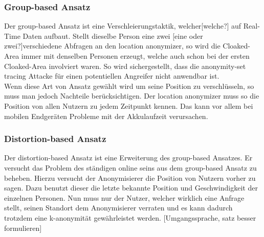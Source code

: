 \subsubsection{Group-based Ansatz} 
Der group-based Ansatz ist eine Verschleierungstaktik, welcher[welche?] auf Real-Time Daten aufbaut. Stellt dieselbe Person eine zwei [eine oder zwei?]verschiedene Abfragen an den location anonymizer, so wird die Cloaked-Area immer mit denselben Personen erzeugt, welche auch schon bei der ersten Cloaked-Area involviert waren. So wird sichergestellt, dass die anonymity-set tracing Attacke für einen potentiellen Angreifer nicht anwendbar ist.\\Wenn diese Art von Ansatz gewählt wird um seine Position zu verschlüsseln, so muss man jedoch Nachteile berücksichtigen. Der location anonymizer muss so die Position von allen Nutzern zu jedem Zeitpunkt kennen. Das kann vor allem bei mobilen Endgeräten Probleme mit der Akkulaufzeit verursachen.  
\subsubsection{Distortion-based Ansatz} 
Der distortion-based Ansatz ist eine Erweiterung des group-based Ansatzes. Er versucht das Problem des ständigen online seins aus dem group-based Ansatz zu beheben. Hierzu versucht der Anonymisierer die Position von Nutzern vorher zu sagen. Dazu benutzt dieser die letzte bekannte Position und Geschwindigkeit der einzelnen Personen. Nun muss nur der Nutzer, welcher wirklich eine Anfrage stellt, seinen Standort dem Anonymisierer verraten und es kann dadurch trotzdem eine k-anonymität gewährleistet werden. [Umgangssprache, satz besser formulieren] 
